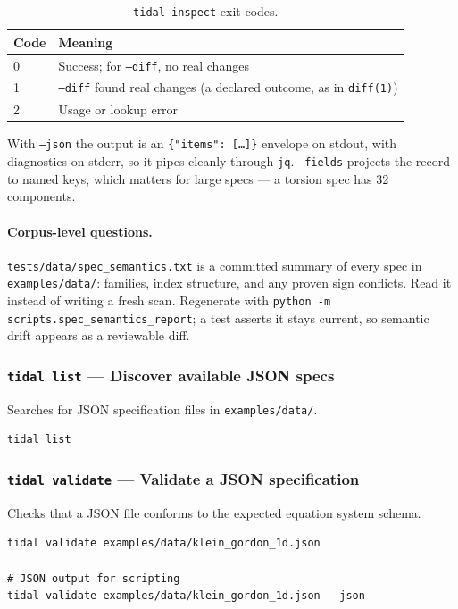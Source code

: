 \begin{table}[H]
\centering
\caption{\texttt{tidal inspect} exit codes.}
\begin{tabular}{ll}
\toprule
Code & Meaning \\
\midrule
0 & Success; for \texttt{--diff}, no real changes \\
1 & \texttt{--diff} found real changes (a declared outcome, as in \texttt{diff(1)}) \\
2 & Usage or lookup error \\
\bottomrule
\end{tabular}
\end{table}

With \texttt{--json} the output is an \texttt{\{"items": [\ldots]\}} envelope
on stdout, with diagnostics on stderr, so it pipes cleanly through
\texttt{jq}. \texttt{--fields} projects the record to named keys, which
matters for large specs --- a torsion spec has 32 components.

\paragraph{Corpus-level questions.}
\texttt{tests/data/spec\_semantics.txt} is a committed summary of every spec
in \texttt{examples/data/}: families, index structure, and any proven sign
conflicts. Read it instead of writing a fresh scan. Regenerate with
\texttt{python -m scripts.spec\_semantics\_report}; a test asserts it stays
current, so semantic drift appears as a reviewable diff.

\subsubsection{\texttt{tidal list} --- Discover available JSON specs}

Searches for JSON specification files in \texttt{examples/data/}.

\begin{lstlisting}[style=bash]
tidal list
\end{lstlisting}

\subsubsection{\texttt{tidal validate} --- Validate a JSON specification}

Checks that a JSON file conforms to the expected equation system schema.

\begin{lstlisting}[style=bash]
tidal validate examples/data/klein_gordon_1d.json

# JSON output for scripting
tidal validate examples/data/klein_gordon_1d.json --json
\end{lstlisting}

